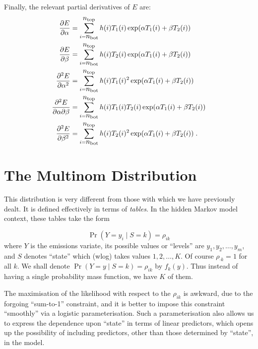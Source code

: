 \enlargethispage{1\baselineskip}
Finally, the relevant partial derivatives of $E$ are:
\begin{align*}
\frac{\partial E}{\partial \alpha} &= \sum_{i=\mbox{$n_{\textup{\textrm{bot}}}$}}^{\mbox{$n_{\textup{\textrm{top}}}$}} h(i) T_1(i)
                                     \exp(\alpha T_1(i) + \beta T_2(i)) \\
\frac{\partial E}{\partial \beta} &= \sum_{i=\mbox{$n_{\textup{\textrm{bot}}}$}}^{\mbox{$n_{\textup{\textrm{top}}}$}} h(i) T_2(i)
                                     \exp(\alpha T_1(i) + \beta T_2(i))\\
\frac{\partial^2 E}{\partial \alpha^2} &= \sum_{i=\mbox{$n_{\textup{\textrm{bot}}}$}}^{\mbox{$n_{\textup{\textrm{top}}}$}} h(i) T_1(i)^2
                                     \exp(\alpha T_1(i) + \beta T_2(i)) \\
\frac{\partial^2 E}{\partial \alpha \partial \beta} &=
         \sum_{i=\mbox{$n_{\textup{\textrm{bot}}}$}}^{\mbox{$n_{\textup{\textrm{top}}}$}} h(i) T_1(i) T_2(i)
         \exp(\alpha T_1(i) + \beta T_2(i)) \\
\frac{\partial^2 E}{\partial \beta^2} &= \sum_{i=\mbox{$n_{\textup{\textrm{bot}}}$}}^{\mbox{$n_{\textup{\textrm{top}}}$}} h(i) T_2(i)^2
                                     \exp(\alpha T_1(i) + \beta T_2(i)) \; .
\end{align*}

\section{The Multinom Distribution}
This distribution is very different from those with which we
have previously dealt.  It is defined effectively in terms of
\emph{tables}.  In the hidden Markov model context, these tables
take the form

\[
\Pr(Y = y_i \mid S = k) = \rho_{ik}
\]
where $Y$ is the emissions variate, its possible values or ``levels''
are $y_1, y_2, \ldots, y_m$, and $S$ denotes ``state'' which (wlog)
takes values $1, 2, \ldots, K$.  Of course $\rho_{\cdot k} = 1$
for all $k$.  We shall denote $\Pr(Y = y \mid S = k) = \rho_{ik}$
by $f_k(y)$.  Thus instead of having a single probability mass
function, we have $K$ of them.

The maximisation of the likelihood with respect to the $\rho_{ik}$
is awkward, due to the forgoing ``sum-to-1'' constraint, and it
is better to impose this constraint ``smoothly'' via a logistic
parameterisation.  Such a parameterisation also allows us to express
the dependence upon ``state'' in terms of linear predictors, which
opens up the possibility of including predictors, other than those
determined by ``state'', in the model.

